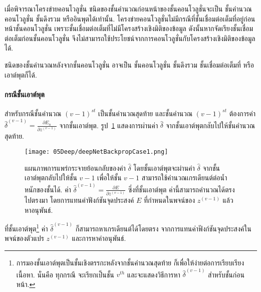 
เมื่อพิจารณาโครงข่ายคอนโวลูชั่น ชนิดของชั้นคำนวณก่อนหน้าของชั้นคอนโวลูชั่นจะเป็น ชั้นคำนวณคอนโวลูชั่น ชั้นดึงรวม หรืออินพุตได้เท่านั้น. 
โครงข่ายคอนโวลูชั่นไม่มีกรณีที่ชั้นเชื่อมต่อเต็มที่อยู่ก่อนหน้าชั้นคอนโวลูชั่น เพราะชั้นเชื่อมต่อเต็มที่ไม่มีโครงสร้างเชิงมิติของข้อมูล
ดังนั้นหากจัดเรียงชั้นเชื่อมต่อเต็มก่อนชั้นคอนโวลูชั่น จึงไม่สามารถใช้ประโยชน์จากการคอนโวลูชั่นกับโครงสร้างเชิงมิติของข้อมูลได้.

ชนิดของชั้นคำนวณหลังจากชั้นคอนโวลูชั่น อาจเป็น
ชั้นคอนโวลูชั่น ชั้นดึงรวม ชั้นเชื่อมต่อเต็มที่ หรือเอาต์พุตก็ได้.

\paragraph{กรณีชั้นเอาต์พุต}
สำหรับกรณีชั้นคำนวณ $(v-1)^{st}$ เป็นชั้นคำนวณสุดท้าย
และชั้นคำนวณ $(v-1)^{st}$
ต้องการค่า $\hat{\delta}^{(v-1)}
= \frac{\partial E_n}{\partial z^{(v-1)}}$ จากชั้นเอาต์พุต.
รูป~\ref{fig: deep layer case output} แสดงการผ่านค่า $\hat{\delta}$ จากชั้นเอาต์พุตกลับไปให้ชั้นคำนวณสุดท้าย.

%
\begin{figure}
	\begin{center}
		\texttt{[image: 05Deep/deepNetBackpropCase1.png]}
		\caption[การแพร่กระจายย้อนกลับจากชั้นเอาต์พุต]{แผนภาพการแพร่กระจายย้อนกลับของค่า $\hat{\delta}$ โดยชั้นเอาต์พุตจะผ่านค่า $\hat{\delta}$ จากชั้นเอาต์พุตกลับไปให้ชั้น $v-1$ เพื่อให้ชั้น $v-1$ สามารถใช้คำนวณเกรเดียนต์ต่อน้ำหนักของชั้นได้.
			ค่า $\hat{\delta}^{(v-1)} = \frac{\partial E}{\partial z^{(v-1)}}$ ซึ่งที่ชั้นเอาต์พุต ค่านี้สามารถคำนวณได้ตรงไปตรงมา โดยการแทนค่าฟังก์ชันจุดประสงค์ $E$ ที่กำหนดในพจน์ของ $z^{(v-1)}$ แล้วหาอนุพันธ์.
		}
		\label{fig: deep layer case output}
	\end{center}
\end{figure}
%


ที่ชั้นเอาต์พุต\footnote{%
	การมองชั้นเอาต์พุตเป็นชั้นเชิงตรรกะหลังจากชั้นคำนวณสุดท้าย 
	ก็เพื่อให้ง่ายต่อการเรียบเรียงเนื้อหา.
	นั่นคือ ทุกกรณี จะเรียกเป็นชั้น $v^{th}$ และจะแสดงวิธีการหา $\hat{\delta}^{(v-1)}$ สำหรับชั้นก่อนหน้า.
}
ค่า $\hat{\delta}^{(v-1)}$
ก็สามารถหาเกรเดียนต์ได้โดยตรง จากการแทนค่าฟังก์ชันจุดประสงค์ในพจน์ของตัวแปร $z^{(v-1)}$ และการหาค่าอนุพันธ์.

